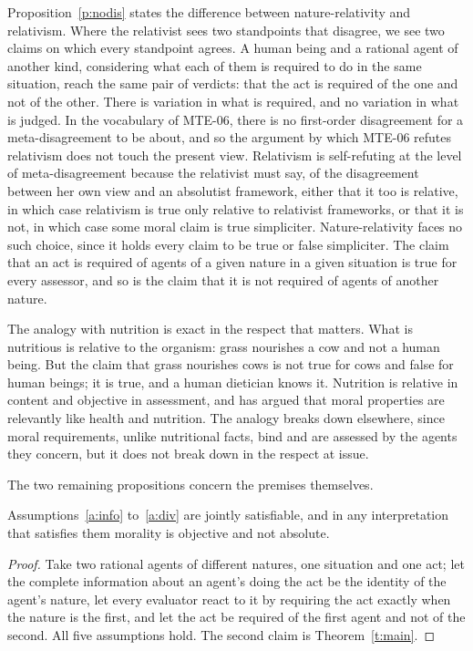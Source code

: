 \documentclass{situationist-preprint}
\begin{document}
Proposition~\ref{p:nodis} states the difference between nature-relativity and relativism. Where the relativist sees two standpoints that disagree, we see two claims on which every standpoint agrees. A human being and a rational agent of another kind, considering what each of them is required to do in the same situation, reach the same pair of verdicts: that the act is required of the one and not of the other. There is variation in what is required, and no variation in what is judged. In the vocabulary of MTE-06, there is no first-order disagreement for a meta-disagreement to be about, and so the argument by which MTE-06 refutes relativism does not touch the present view. Relativism is self-refuting at the level of meta-disagreement because the relativist must say, of the disagreement between her own view and an absolutist framework, either that it too is relative, in which case relativism is true only relative to relativist frameworks, or that it is not, in which case some moral claim is true simpliciter. Nature-relativity faces no such choice, since it holds every claim to be true or false simpliciter. The claim that an act is required of agents of a given nature in a given situation is true for every assessor, and so is the claim that it is not required of agents of another nature.

The analogy with nutrition is exact in the respect that matters. What is nutritious is relative to the organism: grass nourishes a cow and not a human being. But the claim that grass nourishes cows is not true for cows and false for human beings; it is true, and a human dietician knows it. Nutrition is relative in content and objective in assessment, and \citet{Bloomfield2001} has argued that moral properties are relevantly like health and nutrition. The analogy breaks down elsewhere, since moral requirements, unlike nutritional facts, bind and are assessed by the agents they concern, but it does not break down in the respect at issue.

The two remaining propositions concern the premises themselves.

\begin{proposition}[Consistency]\label{p:cons}
Assumptions~\ref{a:info} to~\ref{a:div} are jointly satisfiable, and in any interpretation that satisfies them morality is objective and not absolute.
\end{proposition}

\begin{proof}
Take two rational agents of different natures, one situation and one act; let the complete information about an agent's doing the act be the identity of the agent's nature, let every evaluator react to it by requiring the act exactly when the nature is the first, and let the act be required of the first agent and not of the second. All five assumptions hold. The second claim is Theorem~\ref{t:main}.
\end{proof}
\end{document}
